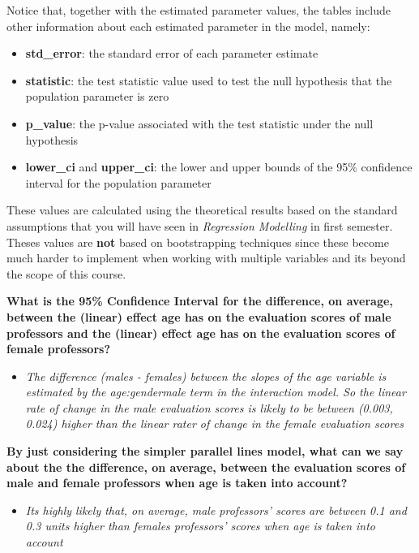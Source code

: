 \documentclass[]{article}
\providecommand{\tightlist}{%
  \setlength{\itemsep}{0pt}\setlength{\parskip}{0pt}}
\begin{document}
Notice that, together with the estimated parameter values, the tables
include other information about each estimated parameter in the model,
namely:

\begin{itemize}
\tightlist
\item
  \textbf{std\_error}: the standard error of each parameter estimate
\item
  \textbf{statistic}: the test statistic value used to test the null
  hypothesis that the population parameter is zero
\item
  \textbf{p\_value}: the p-value associated with the test statistic
  under the null hypothesis
\item
  \textbf{lower\_ci} and \textbf{upper\_ci}: the lower and upper bounds
  of the 95\% confidence interval for the population parameter
\end{itemize}

These values are calculated using the theoretical results based on the
standard assumptions that you will have seen in \emph{Regression
Modelling} in first semester. Theses values are \textbf{not} based on
bootstrapping techniques since these become much harder to implement
when working with multiple variables and its beyond the scope of this
course.

\textbf{What is the 95\% Confidence Interval for the difference, on
average, between the (linear) effect age has on the evaluation scores of
male professors and the (linear) effect age has on the evaluation scores
of female professors?}

\begin{itemize}
\tightlist
\item
  \emph{The difference (males - females) between the slopes of the age
  variable is estimated by the age:gendermale term in the interaction
  model. So the linear rate of change in the male evaluation scores is
  likely to be between (0.003, 0.024) higher than the linear rater of
  change in the female evaluation scores}
\end{itemize}

\textbf{By just considering the simpler parallel lines model, what can
we say about the the difference, on average, between the evaluation
scores of male and female professors when age is taken into account?}

\begin{itemize}
\tightlist
\item
  \emph{Its highly likely that, on average, male professors' scores are
  between 0.1 and 0.3 units higher than females professors' scores when
  age is taken into account}
\end{itemize}
\end{document}
